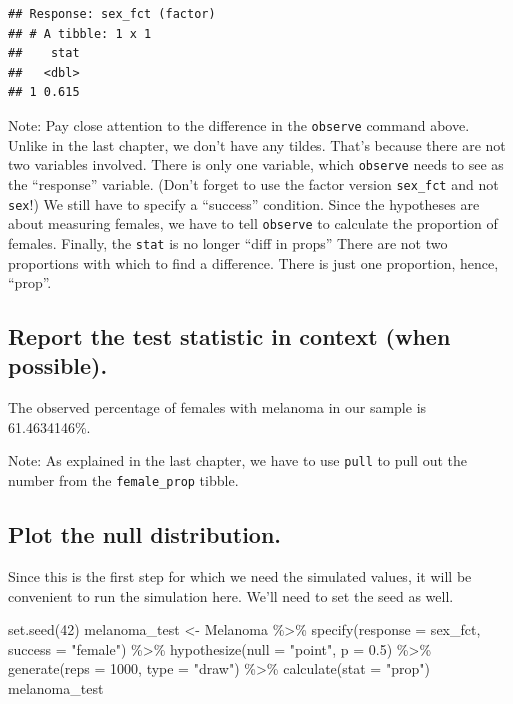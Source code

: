 \documentclass[
]{book}
\newenvironment{Shaded}{\begin{snugshade}}{\end{snugshade}}
\newcommand{\AttributeTok}[1]{\textcolor[rgb]{0.77,0.63,0.00}{#1}}
\newcommand{\DecValTok}[1]{\textcolor[rgb]{0.00,0.00,0.81}{#1}}
\newcommand{\FloatTok}[1]{\textcolor[rgb]{0.00,0.00,0.81}{#1}}
\newcommand{\FunctionTok}[1]{\textcolor[rgb]{0.00,0.00,0.00}{#1}}
\newcommand{\NormalTok}[1]{#1}
\newcommand{\OtherTok}[1]{\textcolor[rgb]{0.56,0.35,0.01}{#1}}
\newcommand{\SpecialCharTok}[1]{\textcolor[rgb]{0.00,0.00,0.00}{#1}}
\newcommand{\StringTok}[1]{\textcolor[rgb]{0.31,0.60,0.02}{#1}}
\begin{document}
\begin{verbatim}
## Response: sex_fct (factor)
## # A tibble: 1 x 1
##    stat
##   <dbl>
## 1 0.615
\end{verbatim}

Note: Pay close attention to the difference in the \texttt{observe} command above. Unlike in the last chapter, we don't have any tildes. That's because there are not two variables involved. There is only one variable, which \texttt{observe} needs to see as the ``response'' variable. (Don't forget to use the factor version \texttt{sex\_fct} and not \texttt{sex}!) We still have to specify a ``success'' condition. Since the hypotheses are about measuring females, we have to tell \texttt{observe} to calculate the proportion of females. Finally, the \texttt{stat} is no longer ``diff in props'' There are not two proportions with which to find a difference. There is just one proportion, hence, ``prop''.

\hypertarget{hypothesis2-ex-report-test-stat}{%
\subsection{Report the test statistic in context (when possible).}\label{hypothesis2-ex-report-test-stat}}

The observed percentage of females with melanoma in our sample is 61.4634146\%.

Note: As explained in the last chapter, we have to use \texttt{pull} to pull out the number from the \texttt{female\_prop} tibble.

\hypertarget{hypothesis2-ex-plot-null}{%
\subsection{Plot the null distribution.}\label{hypothesis2-ex-plot-null}}

Since this is the first step for which we need the simulated values, it will be convenient to run the simulation here. We'll need to set the seed as well.

\begin{Shaded}
\begin{Highlighting}[]
\FunctionTok{set.seed}\NormalTok{(}\DecValTok{42}\NormalTok{)}
\NormalTok{melanoma\_test }\OtherTok{\textless{}{-}}\NormalTok{ Melanoma }\SpecialCharTok{\%\textgreater{}\%}
    \FunctionTok{specify}\NormalTok{(}\AttributeTok{response =}\NormalTok{ sex\_fct, }\AttributeTok{success =} \StringTok{"female"}\NormalTok{) }\SpecialCharTok{\%\textgreater{}\%}
    \FunctionTok{hypothesize}\NormalTok{(}\AttributeTok{null =} \StringTok{"point"}\NormalTok{, }\AttributeTok{p =} \FloatTok{0.5}\NormalTok{) }\SpecialCharTok{\%\textgreater{}\%}
    \FunctionTok{generate}\NormalTok{(}\AttributeTok{reps =} \DecValTok{1000}\NormalTok{, }\AttributeTok{type =} \StringTok{"draw"}\NormalTok{) }\SpecialCharTok{\%\textgreater{}\%}
    \FunctionTok{calculate}\NormalTok{(}\AttributeTok{stat =} \StringTok{"prop"}\NormalTok{)}
\NormalTok{melanoma\_test}
\end{Highlighting}
\end{Shaded}
\end{document}
